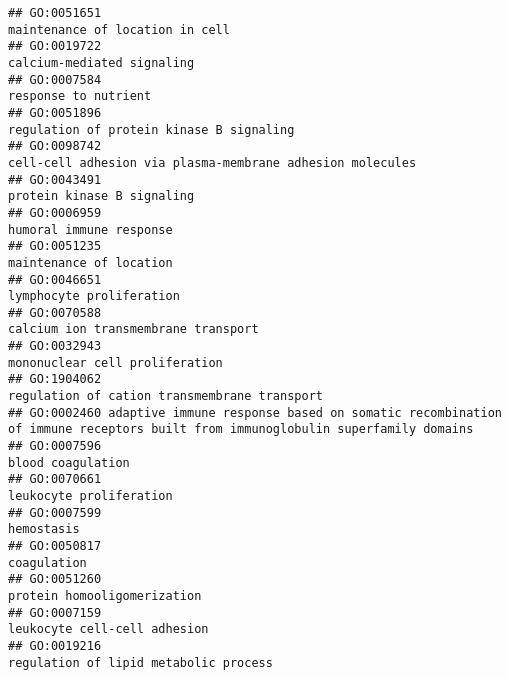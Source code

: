 \documentclass[
]{article}
\begin{document}
\begin{verbatim}
## GO:0051651                                                                                           maintenance of location in cell
## GO:0019722                                                                                                calcium-mediated signaling
## GO:0007584                                                                                                      response to nutrient
## GO:0051896                                                                                  regulation of protein kinase B signaling
## GO:0098742                                                                 cell-cell adhesion via plasma-membrane adhesion molecules
## GO:0043491                                                                                                protein kinase B signaling
## GO:0006959                                                                                                   humoral immune response
## GO:0051235                                                                                                   maintenance of location
## GO:0046651                                                                                                  lymphocyte proliferation
## GO:0070588                                                                                       calcium ion transmembrane transport
## GO:0032943                                                                                            mononuclear cell proliferation
## GO:1904062                                                                              regulation of cation transmembrane transport
## GO:0002460 adaptive immune response based on somatic recombination of immune receptors built from immunoglobulin superfamily domains
## GO:0007596                                                                                                         blood coagulation
## GO:0070661                                                                                                   leukocyte proliferation
## GO:0007599                                                                                                                hemostasis
## GO:0050817                                                                                                               coagulation
## GO:0051260                                                                                               protein homooligomerization
## GO:0007159                                                                                              leukocyte cell-cell adhesion
## GO:0019216                                                                                     regulation of lipid metabolic process

\end{verbatim}
\end{document}
